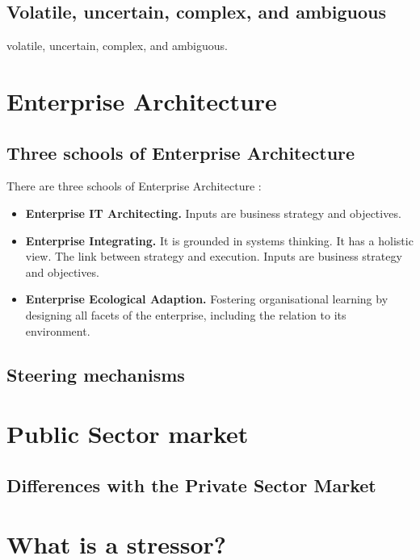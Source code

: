 \subsection{Volatile, uncertain, complex, and ambiguous}
\label{seb:tbvuca}

\Gls{volatile}, \gls{uncertain}, \gls{complex}, and \gls{ambiguous}.

\section{Enterprise Architecture}
\label{sec:tbea}

\subsection{Three schools of Enterprise Architecture}

There are three schools of Enterprise Architecture \parencite{Lapalme2012}:
\begin{itemize}
	\item{\textbf{Enterprise IT Architecting.} Inputs are business strategy and objectives.}
	\item{\textbf{Enterprise Integrating.} It is grounded in systems thinking. It has a holistic view. The link between strategy and execution. Inputs are business strategy and objectives.}
	\item{\textbf{Enterprise Ecological Adaption.} Fostering organisational learning by designing all facets of the enterprise, including the relation to its environment.}
\end{itemize}

\subsection{Steering mechanisms}
\label{sub:tbeasteering}

\section{Public Sector market}
\label{sec:tbpsmarket}

\subsection{Differences with the Private Sector Market}
\label{sub:tbdifferenceprivatesector}

\section{What is a stressor?}
\label{sec:stressor}

